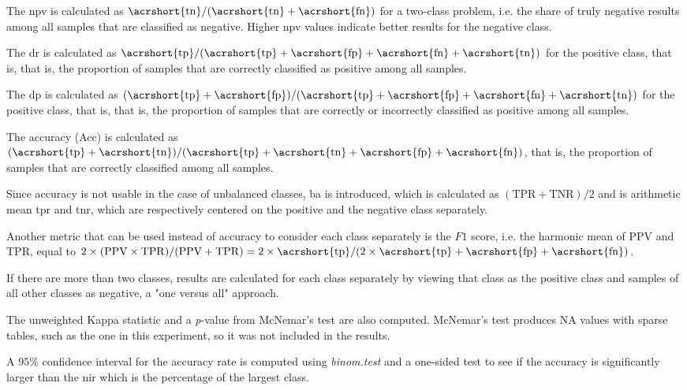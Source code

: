 \documentclass[sn-mathphys-num]{sn-jnl}%
\begin{document}
The \acrfull{npv} is calculated as $\mathrm{\acrshort{tn}}/(\mathrm{\acrshort{tn}}+\mathrm{\acrshort{fn}})$ for a two-class problem, i.e. the share of truly negative results among all samples that are classified as negative. Higher \acrshort{npv} values indicate better results for the negative class.

The \acrfull{dr} is calculated as $\mathrm{\acrshort{tp}}/(\mathrm{\acrshort{tp}}+\mathrm{\acrshort{fp}}+\mathrm{\acrshort{fn}}+\mathrm{\acrshort{tn}})$ for the positive class, that is, that is, the proportion of samples that are correctly classified as positive among all samples.

The \acrfull{dp} is calculated as $(\mathrm{\acrshort{tp}}+\mathrm{\acrshort{fp}})/(\mathrm{\acrshort{tp}}+\mathrm{\acrshort{fp}}+\mathrm{\acrshort{fn}}+\mathrm{\acrshort{tn}})$ for the positive class, that is, that is, the proportion of samples that are correctly or incorrectly classified as positive among all samples.

The accuracy (Acc) is calculated as $(\mathrm{\acrshort{tp}} + \mathrm{\acrshort{tn}}) / (\mathrm{\acrshort{tp}} + \mathrm{\acrshort{tn}} + \mathrm{\acrshort{fp}} + \mathrm{\acrshort{fn}})$, that is, the proportion of samples that are correctly classified among all samples.

Since accuracy is not usable in the case of unbalanced classes, \acrfull{ba} is introduced, which is calculated as $(\mathrm{TPR} + \mathrm{TNR}) / 2$ and is arithmetic mean \acrshort{tpr} and \acrshort{tnr}, which are respectively centered on the positive and the negative class separately.

Another metric that can be used instead of accuracy to consider each class separately is the $F1$ score, i.e. the harmonic mean of PPV and TPR, equal to $2 \times (\mathrm{PPV} \times \mathrm{TPR}) / (\mathrm{PPV} + \mathrm{TPR}) = 2 \times \mathrm{\acrshort{tp}} / (2 \times \mathrm{\acrshort{tp}} + \mathrm{\acrshort{fp}} + \mathrm{\acrshort{fn}})$.

If there are more than two classes, results are calculated for each class separately by viewing that class as the positive class and samples of all other classes as negative, a "one versus all" approach.

The unweighted Kappa statistic and a \textit{p}-value from McNemar's test are also computed. McNemar's test produces NA values with sparse tables, such as the one in this experiment, so it was not included in the results.

A $95\%$ confidence interval for the accuracy rate is computed using \textit{binom.test} and a one-sided test \cite{binom.test2024, clopper1934use, conover1999practical, hollander2013nonparametric} to see if the accuracy is significantly larger than the \acrfull{nir} which is the percentage of the largest class.
\end{document}
